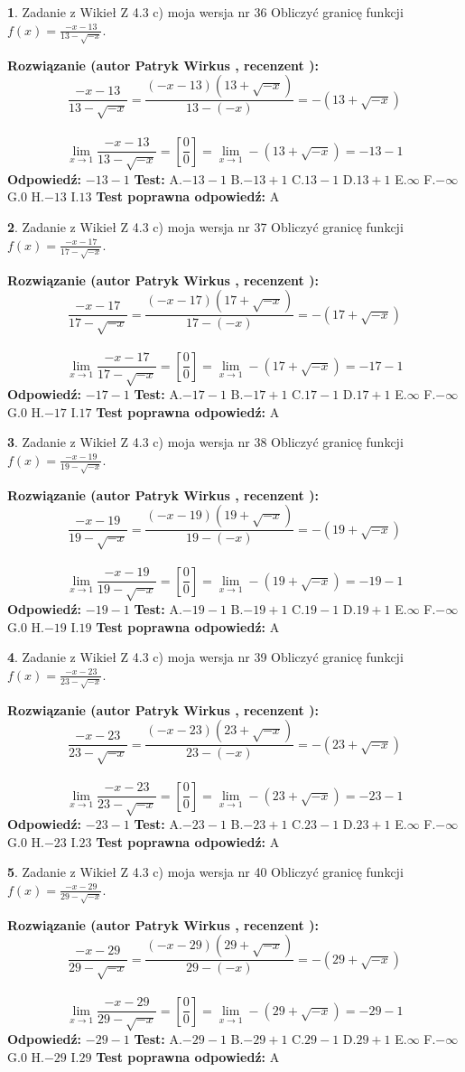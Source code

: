 \documentclass[12pt, a4paper]{article}
\theoremstyle{definition} %
\newtheorem{zad}{}
\newcommand{\zadStart}[1]{\begin{zad}#1\newline}
\newcommand{\zadStop}{\end{zad}}
\newcommand{\rozwStart}[2]{\noindent \textbf{Rozwiązanie (autor #1 , recenzent #2): }\newline}
\newcommand{\rozwStop}{\newline}
\newcommand{\odpStart}{\noindent \textbf{Odpowiedź:}\newline}
\newcommand{\odpStop}{\newline}
\newcommand{\testStart}{\noindent \textbf{Test:}\newline}
\newcommand{\testStop}{\newline}
\newcommand{\kluczStart}{\noindent \textbf{Test poprawna odpowiedź:}\newline}
\newcommand{\kluczStop}{\newline}
\begin{document}
\zadStart{Zadanie z Wikieł Z 4.3 c) moja wersja nr 36}
Obliczyć granicę funkcji $f(x)=\frac{-x-13}{13-\sqrt{-x}}$.
\zadStop
\rozwStart{Patryk Wirkus}{}
$$\frac{-x-13}{13-\sqrt{-x}}=\frac{(-x-13)(13+\sqrt{-x})}{13-(-x)}=-(13+\sqrt{-x})$$
\\
$$\lim\limits_{x\to1}\frac{-x-13}{13-\sqrt{-x}}=[\frac{0}{0}]=\lim\limits_{x\to1}-(13+\sqrt{-x}) =-13-1$$
\rozwStop
\odpStart
$-13-1$
\odpStop
\testStart
A.$-13-1$
B.$-13+1$
C.$13-1$
D.$13+1$
E.$\infty$
F.$-\infty$
G.$0$
H.$-13$
I.$13$
\testStop
\kluczStart
A
\kluczStop



\zadStart{Zadanie z Wikieł Z 4.3 c) moja wersja nr 37}
Obliczyć granicę funkcji $f(x)=\frac{-x-17}{17-\sqrt{-x}}$.
\zadStop
\rozwStart{Patryk Wirkus}{}
$$\frac{-x-17}{17-\sqrt{-x}}=\frac{(-x-17)(17+\sqrt{-x})}{17-(-x)}=-(17+\sqrt{-x})$$
\\
$$\lim\limits_{x\to1}\frac{-x-17}{17-\sqrt{-x}}=[\frac{0}{0}]=\lim\limits_{x\to1}-(17+\sqrt{-x}) =-17-1$$
\rozwStop
\odpStart
$-17-1$
\odpStop
\testStart
A.$-17-1$
B.$-17+1$
C.$17-1$
D.$17+1$
E.$\infty$
F.$-\infty$
G.$0$
H.$-17$
I.$17$
\testStop
\kluczStart
A
\kluczStop



\zadStart{Zadanie z Wikieł Z 4.3 c) moja wersja nr 38}
Obliczyć granicę funkcji $f(x)=\frac{-x-19}{19-\sqrt{-x}}$.
\zadStop
\rozwStart{Patryk Wirkus}{}
$$\frac{-x-19}{19-\sqrt{-x}}=\frac{(-x-19)(19+\sqrt{-x})}{19-(-x)}=-(19+\sqrt{-x})$$
\\
$$\lim\limits_{x\to1}\frac{-x-19}{19-\sqrt{-x}}=[\frac{0}{0}]=\lim\limits_{x\to1}-(19+\sqrt{-x}) =-19-1$$
\rozwStop
\odpStart
$-19-1$
\odpStop
\testStart
A.$-19-1$
B.$-19+1$
C.$19-1$
D.$19+1$
E.$\infty$
F.$-\infty$
G.$0$
H.$-19$
I.$19$
\testStop
\kluczStart
A
\kluczStop



\zadStart{Zadanie z Wikieł Z 4.3 c) moja wersja nr 39}
Obliczyć granicę funkcji $f(x)=\frac{-x-23}{23-\sqrt{-x}}$.
\zadStop
\rozwStart{Patryk Wirkus}{}
$$\frac{-x-23}{23-\sqrt{-x}}=\frac{(-x-23)(23+\sqrt{-x})}{23-(-x)}=-(23+\sqrt{-x})$$
\\
$$\lim\limits_{x\to1}\frac{-x-23}{23-\sqrt{-x}}=[\frac{0}{0}]=\lim\limits_{x\to1}-(23+\sqrt{-x}) =-23-1$$
\rozwStop
\odpStart
$-23-1$
\odpStop
\testStart
A.$-23-1$
B.$-23+1$
C.$23-1$
D.$23+1$
E.$\infty$
F.$-\infty$
G.$0$
H.$-23$
I.$23$
\testStop
\kluczStart
A
\kluczStop



\zadStart{Zadanie z Wikieł Z 4.3 c) moja wersja nr 40}
Obliczyć granicę funkcji $f(x)=\frac{-x-29}{29-\sqrt{-x}}$.
\zadStop
\rozwStart{Patryk Wirkus}{}
$$\frac{-x-29}{29-\sqrt{-x}}=\frac{(-x-29)(29+\sqrt{-x})}{29-(-x)}=-(29+\sqrt{-x})$$
\\
$$\lim\limits_{x\to1}\frac{-x-29}{29-\sqrt{-x}}=[\frac{0}{0}]=\lim\limits_{x\to1}-(29+\sqrt{-x}) =-29-1$$
\rozwStop
\odpStart
$-29-1$
\odpStop
\testStart
A.$-29-1$
B.$-29+1$
C.$29-1$
D.$29+1$
E.$\infty$
F.$-\infty$
G.$0$
H.$-29$
I.$29$
\testStop
\kluczStart
A
\kluczStop
\end{document}
